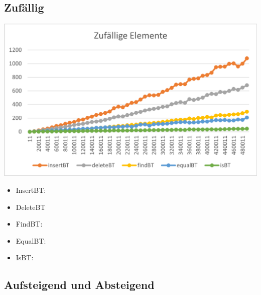 \documentclass[11pt]{article}
\begin{document}
    \subsection{Zufällig}\label{subsec:zufaellig}

    \begin{center}
        \includegraphics[width=0.9\columnwidth] {ZeitAvg.pdf}
    \end{center}

    \begin{itemize}
        \item InsertBT:

        \item DeleteBT

        \item FindBT:

        \item EqualBT:

        \item IsBT:
    \end{itemize}

    \subsection{Aufsteigend und Absteigend}\label{subsec:average}
\end{document}
